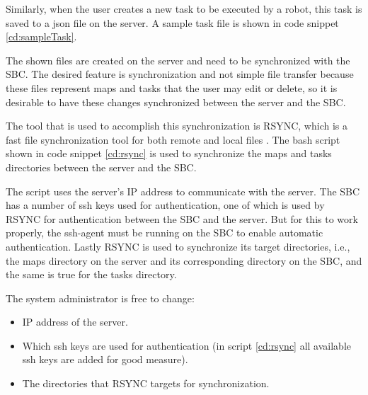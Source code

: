 \newpage

Similarly, when the user creates a new task to be executed by a robot, this task is saved to a json file on the server. A sample task file is shown in code snippet \ref{cd:sampleTask}.



The shown files are created on the server and need to be synchronized with the SBC. The desired feature is synchronization and not simple file transfer because these files represent maps and tasks that the user may edit or delete, so it is desirable to have these changes synchronized between the server and the SBC.

The tool that is used to accomplish this synchronization is RSYNC, which is a fast file synchronization tool for both remote and local files \cite{rsync-github}. The bash script shown in code snippet \ref{cd:rsync} is used to synchronize the maps and tasks directories between the server and the SBC.

The script uses the server's IP address to communicate with the server. The SBC has a number of ssh keys used for authentication, one of which is used by RSYNC for authentication between the SBC and the server. But for this to work properly, the ssh-agent must be running on the SBC to enable automatic authentication. Lastly RSYNC is used to synchronize its target directories, i.e., the maps directory on the server and its corresponding directory on the SBC, and the same is true for the tasks directory.

The system administrator is free to change:
\begin{itemize}
	\item IP address of the server.
	\item Which ssh keys are used for authentication (in script \ref{cd:rsync} all available ssh keys are added for good measure).
	\item The directories that RSYNC targets for synchronization.
\end{itemize}

\newpage



